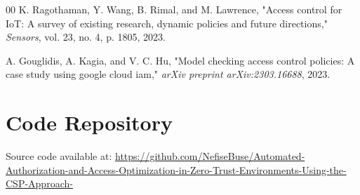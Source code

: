 \documentclass[conference]{IEEEtran}
\begin{document}
\begin{thebibliography}{00}
         K. Ragothaman, Y. Wang, B. Rimal, and M. Lawrence, "Access control for IoT: A survey of existing research, dynamic policies and future directions," \textit{Sensors}, vol. 23, no. 4, p. 1805, 2023.

         A. Gouglidis, A. Kagia, and V. C. Hu, "Model checking access control policies: A case study using google cloud iam," \textit{arXiv preprint arXiv:2303.16688}, 2023.

\end{thebibliography}
	
	\appendix
	\section{Code Repository}
	\label{app:code}
	
	Source code available at: \url{https://github.com/NefiseBuse/Automated-Authorization-and-Access-Optimization-in-Zero-Trust-Environments-Using-the-CSP-Approach-}
	
	
\end{document}
